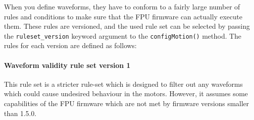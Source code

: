 \documentclass[11pt,a4paper]{scrartcl}
\begin{document}
When you define waveforms, they have to conform to a fairly large
number of rules and conditions to make sure that the FPU firmware can
actually execute them. These rules are versioned, and the used rule
set can be selected by passing the \texttt{ruleset\_version} keyword
argument to the \texttt{configMotion()} method.  The rules for each
version are defined as follows:

\paragraph{Waveform validity rule set version 1}

This rule set is a stricter rule-set which is designed to filter out
any waveforms which could cause undesired behaviour in the motors.
However, it assumes some capabilities of the FPU firmware which are
not met by firmware versions smaller than 1.5.0.
\end{document}
